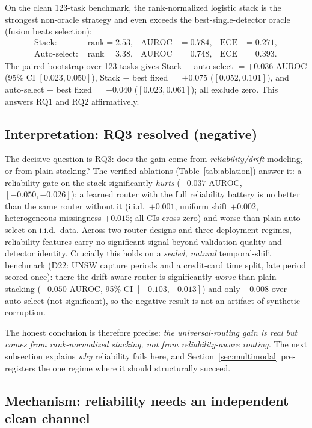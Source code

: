 \documentclass[11pt,titlepage]{article}
\begin{document}
On the clean 123-task benchmark, the rank-normalized logistic stack is the strongest
non-oracle strategy and even exceeds the best-single-detector oracle (fusion beats
selection):
\begin{align*}
\text{Stack: } &\text{rank}=2.53, & \text{AUROC}&=0.784, & \text{ECE}&=0.271,\\
\text{Auto-select: } &\text{rank}=3.38, & \text{AUROC}&=0.748, & \text{ECE}&=0.393.
\end{align*}
The paired bootstrap over 123 tasks gives Stack $-$ auto-select $=+0.036$ AUROC
(95\% CI $[0.023,0.050]$), Stack $-$ best fixed $=+0.075$ ($[0.052,0.101]$), and
auto-select $-$ best fixed $=+0.040$ ($[0.023,0.061]$); all exclude zero. This
answers RQ1 and RQ2 affirmatively.

\subsection{Interpretation: RQ3 resolved (negative)}

The decisive question is RQ3: does the gain come from \emph{reliability/drift}
modeling, or from plain stacking? The verified ablations (Table~\ref{tab:ablation})
answer it: a reliability gate on the stack significantly \emph{hurts} ($-0.037$ AUROC,
$[-0.050,-0.026]$); a learned router with the full reliability battery is no better
than the same router without it (i.i.d.\ $+0.001$, uniform shift $+0.002$, heterogeneous
missingness $+0.015$; all CIs cross zero) and worse than plain auto-select on i.i.d.\
data. Across two router designs and three deployment regimes, reliability features
carry no significant signal beyond validation quality and detector identity. Crucially this holds on a \emph{sealed, natural}
temporal-shift benchmark (D22: UNSW capture periods and a credit-card time split,
late period scored once): there the drift-aware router is significantly
\emph{worse} than plain stacking ($-0.050$ AUROC, 95\% CI $[-0.103,-0.013]$) and
only $+0.008$ over auto-select (not significant), so the negative result is not an
artifact of synthetic corruption.

The honest conclusion is therefore precise: \emph{the universal-routing gain is real
but comes from rank-normalized stacking, not from reliability-aware routing.} The next
subsection explains \emph{why} reliability fails here, and Section~\ref{sec:multimodal}
pre-registers the one regime where it should structurally succeed.

\subsection{Mechanism: reliability needs an independent clean channel}\label{sec:mechanism}
\end{document}
